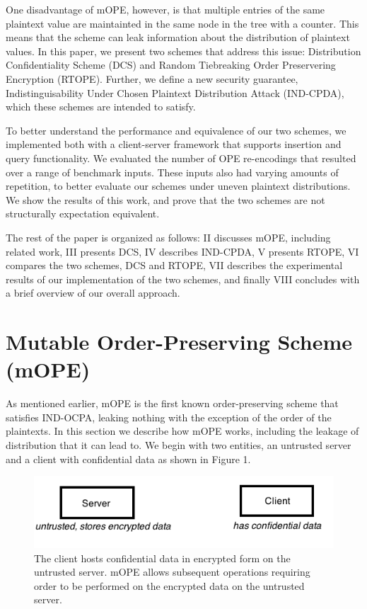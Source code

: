 \documentclass[12pt]{article}
\begin{document}
One disadvantage of mOPE, however, is that multiple entries of the same plaintext value are maintainted in the same node in the tree with a counter. This means that the scheme can leak information about the distribution of plaintext values. In this paper, we present two schemes that address this issue: Distribution Confidentiality Scheme (DCS) and Random Tiebreaking Order Preservering Encryption (RTOPE). Further, we define a new security guarantee, Indistinguisability Under Chosen Plaintext Distribution Attack (IND-CPDA), which these schemes are intended to satisfy.

To better understand the performance and equivalence of our two schemes, we implemented both with a client-server framework that supports insertion and query functionality. We evaluated the number of OPE re-encodings that resulted over a range of benchmark inputs. These inputs also had varying amounts of repetition, to better evaluate our schemes under uneven plaintext distributions. We show the results of this work, and prove that the two schemes are not structurally expectation equivalent.

The rest of the paper is organized as follows: II discusses mOPE, including related work, III presents DCS, IV describes IND-CPDA, V presents RTOPE, VI compares the two schemes, DCS and RTOPE, VII describes the experimental results of our implementation of the two schemes, and finally VIII concludes with a brief overview of our overall approach. 

\section{Mutable Order-Preserving Scheme (mOPE)}

As mentioned earlier, mOPE is the first known order-preserving scheme that satisfies IND-OCPA, leaking nothing with the exception of the order of the plaintexts. In this section we describe how mOPE works, including the leakage of distribution that it can lead to. We begin with two entities, an untrusted server and a client with confidential data as shown in Figure 1.

\begin{figure}[htb]
\begin{center}
\includegraphics[scale=0.6]{857pic4.png}
\caption{The client hosts confidential data in encrypted form on the untrusted server. mOPE allows subsequent operations requiring order to be performed on the encrypted data on the untrusted server.}
\end{center}
\end{figure}
\end{document}
